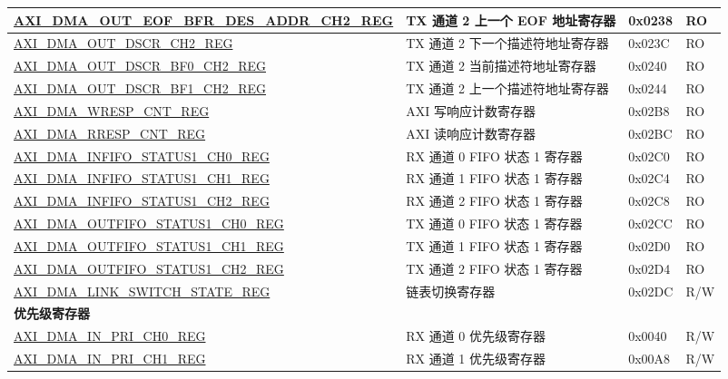 \begin{longtable}{ | l | l | p{1.3cm} | l | }
\hyperref[regdesc:AXIDMAOUTEOFBFRDESADDRCHNREG]{AXI\_DMA\_OUT\_EOF\_BFR\_DES\_ADDR\_CH2\_REG} & TX 通道 2 上一个 EOF 地址寄存器 & 0x0238 & RO \\ \hline
\hyperref[regdesc:AXIDMAOUTDSCRCHNREG]{AXI\_DMA\_OUT\_DSCR\_CH2\_REG} & TX 通道 2 下一个描述符地址寄存器 & 0x023C & RO \\ \hline
\hyperref[regdesc:AXIDMAOUTDSCRBF0CHNREG]{AXI\_DMA\_OUT\_DSCR\_BF0\_CH2\_REG} & TX 通道 2 当前描述符地址寄存器 & 0x0240 & RO \\ \hline
\hyperref[regdesc:AXIDMAOUTDSCRBF1CHNREG]{AXI\_DMA\_OUT\_DSCR\_BF1\_CH2\_REG} & TX 通道 2 上一个描述符地址寄存器 & 0x0244 & RO \\ \hline
\hyperref[regdesc:AXIDMAWRESPCNTREG]{AXI\_DMA\_WRESP\_CNT\_REG} & AXI 写响应计数寄存器 & 0x02B8 & RO \\ \hline
\hyperref[regdesc:AXIDMARRESPCNTREG]{AXI\_DMA\_RRESP\_CNT\_REG} & AXI 读响应计数寄存器 & 0x02BC & RO \\ \hline
\hyperref[regdesc:AXIDMAINFIFOSTATUS1CHNREG]{AXI\_DMA\_INFIFO\_STATUS1\_CH0\_REG} & RX 通道 0 FIFO 状态 1 寄存器 & 0x02C0 & RO \\ \hline
\hyperref[regdesc:AXIDMAINFIFOSTATUS1CHNREG]{AXI\_DMA\_INFIFO\_STATUS1\_CH1\_REG} & RX 通道 1 FIFO 状态 1 寄存器 & 0x02C4 & RO \\ \hline
\hyperref[regdesc:AXIDMAINFIFOSTATUS1CHNREG]{AXI\_DMA\_INFIFO\_STATUS1\_CH2\_REG} & RX 通道 2 FIFO 状态 1 寄存器 & 0x02C8 & RO \\ \hline
\hyperref[regdesc:AXIDMAOUTFIFOSTATUS1CHNREG]{AXI\_DMA\_OUTFIFO\_STATUS1\_CH0\_REG} & TX 通道 0 FIFO 状态 1 寄存器 & 0x02CC & RO \\ \hline
\hyperref[regdesc:AXIDMAOUTFIFOSTATUS1CHNREG]{AXI\_DMA\_OUTFIFO\_STATUS1\_CH1\_REG} & TX 通道 1 FIFO 状态 1 寄存器 & 0x02D0 & RO \\ \hline
\hyperref[regdesc:AXIDMAOUTFIFOSTATUS1CHNREG]{AXI\_DMA\_OUTFIFO\_STATUS1\_CH2\_REG} & TX 通道 2 FIFO 状态 1 寄存器 & 0x02D4 & RO \\ \hline
\hyperref[regdesc:AXIDMALINKSWITCHSTATEREG]{AXI\_DMA\_LINK\_SWITCH\_STATE\_REG} & 链表切换寄存器 & 0x02DC & R/W \\ \hline
\multicolumn{4}{|l|}{\textbf{优先级寄存器}} \\ \hline
\hyperref[regdesc:AXIDMAINPRICHNREG]{AXI\_DMA\_IN\_PRI\_CH0\_REG} & RX 通道 0 优先级寄存器 & 0x0040 & R/W \\ \hline
\hyperref[regdesc:AXIDMAINPRICHNREG]{AXI\_DMA\_IN\_PRI\_CH1\_REG} & RX 通道 1 优先级寄存器 & 0x00A8 & R/W \\ \hline

\end{longtable}
